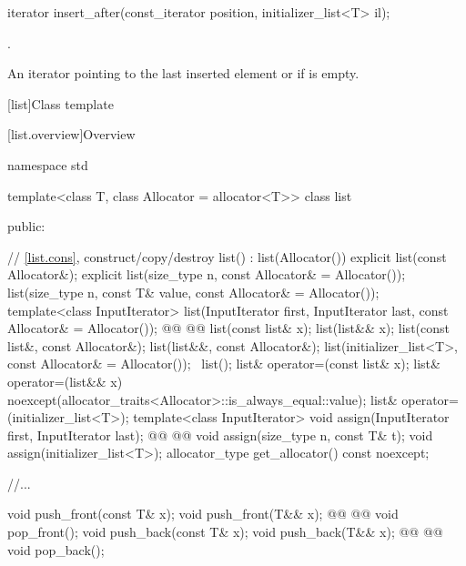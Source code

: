 \documentclass{wg21}
\begin{document}
%
\begin{itemdecl}
    iterator insert_after(const_iterator position, initializer_list<T> il);
\end{itemdecl}

\begin{itemdescr}
    \pnum
    \effects
    .

    \pnum
    \returns
    An iterator pointing to the last inserted element or  if  is empty.
\end{itemdescr}

[list]{Class template }

[list.overview]{Overview}

\begin{codeblock}
namespace std {
    template<class T, class Allocator = allocator<T>>
    class list {
        public:

        // \ref{list.cons}, construct/copy/destroy
        list() : list(Allocator()) { }
        explicit list(const Allocator&);
        explicit list(size_type n, const Allocator& = Allocator());
        list(size_type n, const T& value, const Allocator& = Allocator());
        template<class InputIterator>
        list(InputIterator first, InputIterator last, const Allocator& = Allocator());
        @@
        @@
        list(const list& x);
        list(list&& x);
        list(const list&, const Allocator&);
        list(list&&, const Allocator&);
        list(initializer_list<T>, const Allocator& = Allocator());
        ~list();
        list& operator=(const list& x);
        list& operator=(list&& x)
        noexcept(allocator_traits<Allocator>::is_always_equal::value);
        list& operator=(initializer_list<T>);
        template<class InputIterator>
        void assign(InputIterator first, InputIterator last);
        @@
        @@
        void assign(size_type n, const T& t);
        void assign(initializer_list<T>);
        allocator_type get_allocator() const noexcept;

        //...

        void push_front(const T& x);
        void push_front(T&& x);
        @@
        @@
        void pop_front();
        void push_back(const T& x);
        void push_back(T&& x);
        @@
        @@
        void pop_back();

}}
\end{codeblock}
\end{document}
